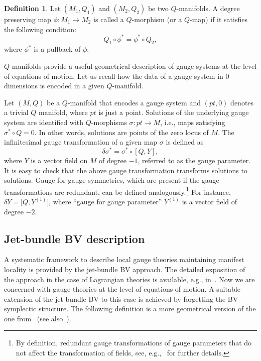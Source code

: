 \documentclass[pdftex]{sigma}
\numberwithin{equation}{section}
\theoremstyle{definition}
\newtheorem{Definition}[Theorem]{Definition}
\newcommand{\changed}[1]{{#1}}
\begin{document}
\begin{Definition}
 Let $(M_1,Q_1)$ and $(M_2,Q_2)$ be two $Q$-manifolds. A degree preserving map $\phi\colon M_1\rightarrow M_2$ is called a $Q$-morphism (or a $Q$-map) if it satisfies the following condition:
 \begin{equation*}
 Q_1\circ\phi^*=\phi^*\circ Q_2,
 \end{equation*}
 where $\phi^*$ is a pullback of $\phi$.
\end{Definition}

$Q$-manifolds provide a useful geometrical description of gauge systems at the level of equations of motion. Let us recall how the data of a gauge system in $0$ dimensions is encoded in a given $Q$-manifold.

Let $(M,Q)$ be a $Q$-manifold that encodes a gauge system and $(pt,0)$ denotes a trivial $Q$ manifold, where $pt$ is just a point. Solutions of the underlying gauge system are identified with $Q$-morphisms $\sigma\colon pt\rightarrow M$, i.e., maps satisfying $\sigma^*\circ Q=0$. In other words, solutions are points of the zero locus of $M$. The infinitesimal gauge transformation of a given map $\sigma$ is defined as
\begin{equation*}
 \delta\sigma^*=\sigma^*\circ[Q,Y],
\end{equation*}
where $Y$ is a vector field on $M$ of degree $-1$, referred to as the gauge parameter. It is easy to check that the above gauge transformation transforms solutions to solutions. \changed{Gauge for gauge symmetries, which are present if the gauge transformations are redundant, can be defined analogously.}\footnote{\changed{By definition, redundant gauge transformations of gauge parameters that do not affect the transformation of fields, see, e.g.,~\cite{Gomis:1995he, HT-book} for further details.}} For instance, $\delta Y=\bigl[Q,Y^{(1)}\bigr]$, where ``gauge for gauge parameter'' $Y^{(1)}$ is a vector field of degree $-2$.


\subsection{Jet-bundle BV description}

A systematic framework to describe local gauge theories maintaining manifest locality is provided by the jet-bundle BV approach. The detailed exposition of the approach in the case of Lagrangian theories is available, e.g., in~\cite{Barnich:2000zw}. Now we are concerned with gauge theories at the level of equations of motion. A suitable extension of the jet-bundle BV to this case is achieved by forgetting the BV symplectic structure. The following definition is a more geometrical version of the one from~\cite{Barnich:2004cr} (see also~\cite{Barnich:2006hbb,Barnich:2010sw,Grigoriev:2022zlq,Kazinski:2005eb}).
\end{document}
